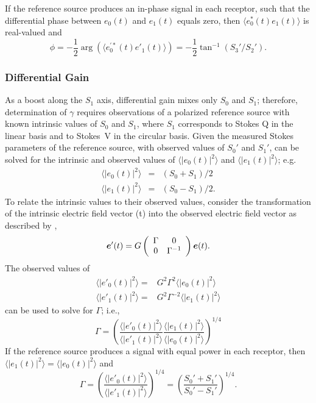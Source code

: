 %
If the reference source produces an in-phase signal in each receptor, 
such that the differential phase between $e_0(t)$ and $e_1(t)$ equals zero,
then $\langle e_0^*(t)e_1(t)\rangle$ is real-valued and
\begin{equation}
\phi = -\frac{1}{2} \arg\left(\langle e_0^{\prime*}(t)e'_1(t) \rangle\right)
= -\frac{1}{2} \tan^{-1}(S_3'/S_2').
\end{equation}

\subsubsection{ Differential Gain }
\label{sec:ideal_differential_gain}

As a boost along the $S_1$ axis, differential gain mixes only $S_0$ and $S_1$;
therefore, determination of $\gamma$ requires observations of a polarized reference source with
known intrinsic values of $S_0$ and $S_1$, where $S_1$
corresponds to Stokes Q in the linear basis and to Stokes~V in the circular basis.
%
Given the measured Stokes parameters of the reference source, with observed values of $S_0'$ and $S_1'$,  can be solved
for the intrinsic and observed values of $\langle|e_0(t)|^2\rangle$ and $\langle|e_1(t)|^2\rangle$; e.g.
\begin{eqnarray}
    \langle|e_0(t)|^2\rangle &=& (S_0 + S_1)/2 \\
    \langle|e_1(t)|^2\rangle &=& (S_0 - S_1)/2.
\end{eqnarray}
%
To relate the intrinsic values to their observed values, 
consider the transformation of the intrinsic electric field vector (t)
into the observed electric field vector as described by ,
%
\begin{equation}
\mbox{\boldmath $e$}'(t)
 = G
  \left( \begin{array}{cc}
    \Gamma & 0 \\
    0   & \Gamma^{-1}
  \end{array} \right) \mbox{\boldmath $e$}(t).
\end{equation}
%
The observed values of 
\begin{equation}
\begin{split}
\langle|e'_0(t)|^2\rangle =& G^2 \Gamma^2 \langle|e_0(t)|^2\rangle \\ \langle|e'_1(t)|^2\rangle =& G^2 \Gamma^{-2} \langle|e_1(t)|^2\rangle
\end{split}
\end{equation}
can be used to solve for $\Gamma$; i.e.,
%
\begin{equation}
\Gamma = \left(
\frac{\langle|e'_0(t)|^2\rangle}{\langle|e'_1(t)|^2\rangle} 
\frac{\langle|e_1(t)|^2\rangle}{\langle|e_0(t)|^2\rangle} \right)^{1/4}
\end{equation}
%
If the reference source produces a signal with equal power in each receptor, 
then $\langle|e_1(t)|^2\rangle=\langle|e_0(t)|^2\rangle$ and
\begin{equation}
\Gamma = \left(
\frac{\langle|e'_0(t)|^2\rangle}{\langle|e'_1(t)|^2\rangle} \right)^{1/4}
=\left(
\frac{S_0' + S_1'}{S_0' - S_1'} \right)^{1/4}.
\end{equation}

